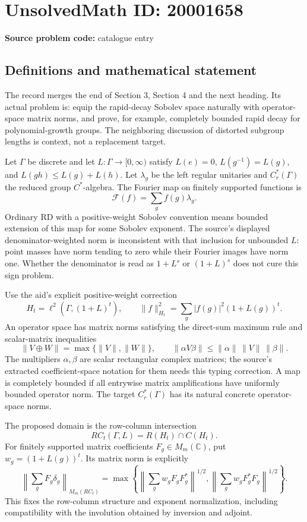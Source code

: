 \documentclass[11pt]{article}
\newcommand{\C}{\mathbb{C}}
\begin{document}
\section*{UnsolvedMath ID: 20001658}
\textbf{Source problem code:} catalogue entry
\subsection{Definitions and mathematical statement}
The record merges the end of Section 3, Section 4 and the next heading. Its actual problem is: equip the rapid-decay Sobolev space naturally with operator-space matrix norms, and prove, for example, completely bounded rapid decay for polynomial-growth groups. The neighboring discussion of distorted subgroup lengths is context, not a replacement target.

Let \(\Gamma\) be discrete and let \(L:\Gamma\to[0,\infty)\) satisfy \(L(e)=0\), \(L(g^{-1})=L(g)\), and \(L(gh)\leq L(g)+L(h)\). Let \(\lambda_g\) be the left regular unitaries and \(C_r^*(\Gamma)\) the reduced group \(C^*\)-algebra. The Fourier map on finitely supported functions is
\[
 \mathcal F(f)=\sum_g f(g)\lambda_g.
\]
Ordinary RD with a positive-weight Sobolev convention means bounded extension of this map for some Sobolev exponent. The source's displayed denominator-weighted norm is inconsistent with that inclusion for unbounded \(L\): point masses have norm tending to zero while their Fourier images have norm one. Whether the denominator is read as \(1+L^s\) or \((1+L)^s\) does not cure this sign problem.

Use the aid's explicit positive-weight correction
\[
 H_t=\ell^2(\Gamma,(1+L)^t),\qquad
 \|f\|_{H_t}^2=\sum_g|f(g)|^2(1+L(g))^t.
\]
An operator space has matrix norms satisfying the direct-sum maximum rule and scalar-matrix inequalities
\[
 \|V\oplus W\|=\max\{\|V\|,\|W\|\},\qquad
 \|\alpha V\beta\|\leq\|\alpha\|\,\|V\|\,\|\beta\|.
\]
The multipliers \(\alpha,\beta\) are scalar rectangular complex matrices; the source's extracted coefficient-space notation for them needs this typing correction. A map is completely bounded if all entrywise matrix amplifications have uniformly bounded operator norm. The target \(C_r^*(\Gamma)\) has its natural concrete operator-space norms.

The proposed domain is the row-column intersection
\[
 RC_t(\Gamma,L)=R(H_t)\cap C(H_t).
\]
For finitely supported matrix coefficients \(F_g\in M_m(\C)\), put \(w_g=(1+L(g))^t\). Its matrix norm is explicitly
\[
 \left\|\sum_gF_g\delta_g\right\|_{M_m(RC_t)}
 =\max\left\{
 \left\|\sum_gw_gF_gF_g^*\right\|^{1/2},
 \left\|\sum_gw_gF_g^*F_g\right\|^{1/2}\right\}.
\]
This fixes the row-column structure and exponent normalization, including compatibility with the involution obtained by inversion and adjoint.
\end{document}
